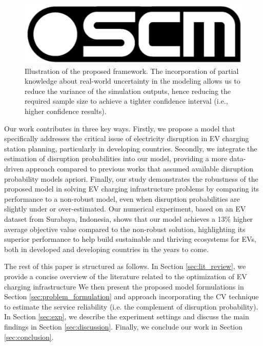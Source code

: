 \documentclass[preprint]{oscmjournal}
\theoremstyle{remark}
\begin{document}
\begin{figure}
    \centering
    \includegraphics[width=0.5\linewidth]{figs/oscm.png}
    \caption{Illustration of the proposed framework. The incorporation of partial knowledge about real-world uncertainty in the modeling allows us to reduce the variance of the simulation outputs, hence reducing the required sample size to achieve a tighter confidence interval (i.e., higher confidence results).}
    \label{fig:framework}
\end{figure}

 
 Our work contributes in three key ways. Firstly, we propose a model that specifically addresses the critical issue of electricity disruption in EV charging station planning, particularly in developing countries. Secondly, we integrate the estimation of disruption probabilities into our model, providing a more data-driven approach compared to previous works that assumed available disruption probability models apriori. Finally, our study demonstrates the robustness of the proposed model in solving EV charging infrastructure problems by comparing its performance to a non-robust model, even when disruption probabilities are slightly under or over-estimated. Our numerical experiment, based on an EV dataset from Surabaya, Indonesia, shows that our model achieves a 13\% higher average objective value compared to the non-robust solution, highlighting its superior performance to help build sustainable and thriving ecosystems for EVs, both in developed and developing countries in the years to come.

 

The rest of this paper is structured as follows. In Section \ref{sec:lit_review}, we provide a concise overview of the literature related to the optimization of EV charging infrastructure%
We then present the proposed model formulations in Section \ref{sec:problem_formulation} %
and approach incorporating the CV technique to estimate the service reliability (i.e. the complement of disruption probability). In Section \ref{sec:exp}, we describe the experiment settings and discuss the main findings in Section \ref{sec:discussion}. Finally, we conclude our work in Section \ref{sec:conclusion}.
\end{document}

